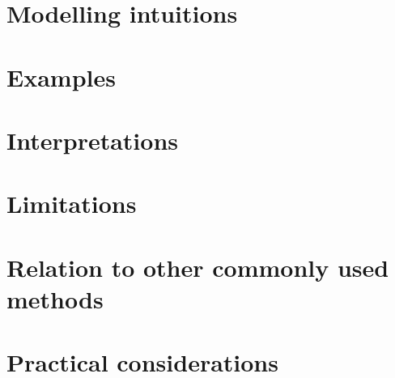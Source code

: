
\section{Modelling intuitions}
\label{cca:intuitions}



\section{Examples}
\label{cca:examples}



\section{Interpretations}
\label{cca:interpretations}



\section{Limitations}
\label{cca:limitations}



\section{Relation to other commonly used methods}
\label{cca:other}



\section{Practical considerations}
\label{cca:impliment}


